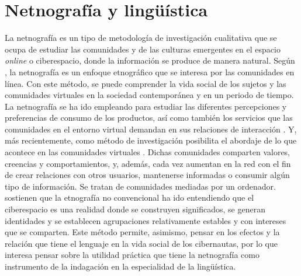 \section{Netnografía y lingüística}\label{sec-netnografiaylinguisica}

La netnografía es un tipo de metodología de investigación cualitativa
que se ocupa de estudiar las comunidades y de las culturas emergentes en
el espacio \emph{online} o ciberespacio, donde la información se produce
de manera natural. Según \textcite{kozinets1998}, la netnografía es un enfoque
etnográfico que se interesa por las comunidades en línea. Con este
método, se puede comprender la vida social de los sujetos y las
comunidades virtuales en la sociedad contemporánea y en un periodo de
tiempo. La netnografía se ha ido empleando para estudiar las diferentes
percepciones y preferencias de consumo de los productos, así como
también los servicios que las comunidades en el entorno virtual demandan
en sus relaciones de interacción \cite{casas-romeo2014,moralesvasquez2020,xun2010netnography}. Y, más recientemente, como método de
investigación posibilita el abordaje de lo que acontece en las
comunidades virtuales \cite[p. 9]{turpo2008}. Dichas comunidades comparten
valores, creencias y comportamientos, y, además, cada vez aumentan en la
red con el fin de crear relaciones con otros usuarios, mantenerse
informadas o consumir algún tipo de información. Se tratan de
comunidades mediadas por un ordenador. \textcite[p. 147]{martinez2017etnografia} sostienen que la etnografía no convencional ha ido entendiendo que
el ciberespacio es una realidad donde se construyen significados, se
generan identidades y se establecen agrupaciones relativamente estables
y con intereses que se comparten. Este método permite, asimismo, pensar
en los efectos y la relación que tiene el lenguaje en la vida social de
los cibernautas, por lo que interesa pensar sobre la utilidad práctica
que tiene la netnografía como instrumento de la indagación en la
especialidad de la lingüística.

